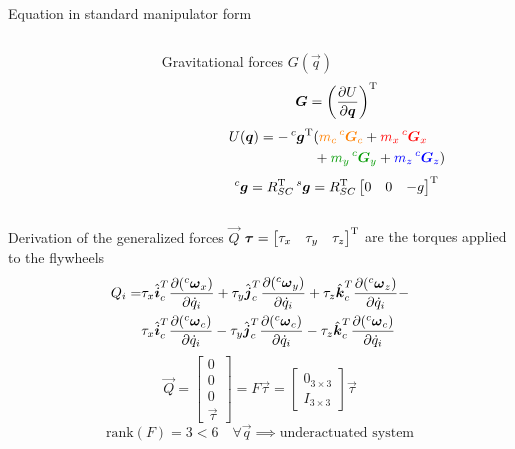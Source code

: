 \begin{frame}[shrink=30]{Equation in standard manipulator form}
\begin{columns}
\begin{column}{0.5\textwidth}
    \end{column}
    \begin{column}{0.5\textwidth}
      \begin{block}{Gravitational forces $G(\vec{q})$}
        \[
        \vec{G} =\left(\frac{\partial U}{\partial \vec{q}}\right) \transpose
        \]
        \[
        \begin{split}
          U(\vec{q}) = - \prescript{c}{}{\vec{g}} \transpose
          &(\cubicFrame{m_c  \prescript{c}{}{\vec{G}}_c} +
          \qx{m_x  \prescript{c}{}{\vec{G}}_x} \\
          &+\qy{m_y  \prescript{c}{}{\vec{G}}_y} +
          \qz{m_z  \prescript{c}{}{\vec{G}}_z})
        \end{split}
        \]
        \[
        \prescript{c}{}{\vec{g}} = R_{SC}\transpose \prescript{s}{}{\vec{g}} = R_{SC}\transpose 
        \begin{bmatrix}
          0 & 0 & -g
        \end{bmatrix} \transpose
        \]
      \end{block}
    \end{column}
  \end{columns}
\end{frame}

\begin{frame}{Derivation of the generalized forces $\vec{Q}$}
  $\vec{\tau} = \begin{bmatrix}
    \tau_x & \tau_y &\tau_z
  \end{bmatrix} \transpose$ are the torques applied to the flywheels
  \[
  \begin{split}
    Q_i = & \tau_{x} \hat{\vec{i}}_c^{T} \frac{\partial (\prescript{c}{}{\vec{\omega}_x})}{\partial \dot{q}_i} +
    \tau_{y} \hat{\vec{j}}_c^{T} \frac{\partial (\prescript{c}{}{\vec{\omega}_y})}{\partial \dot{q}_i} +
    \tau_{z} \hat{\vec{k}}_c^{T} \frac{\partial (\prescript{c}{}{\vec{\omega}_z})}{\partial \dot{q}_i} -\\
    &\tau_{x} \hat{\vec{i}}_c^{T} \frac{\partial (\prescript{c}{}{\vec{\omega}_c})}{\partial \dot{q}_i} -
    \tau_{y} \hat{\vec{j}}_c^{T} \frac{\partial (\prescript{c}{}{\vec{\omega}_c})}{\partial \dot{q}_i} -
    \tau_{z} \hat{\vec{k}}_c^{T} \frac{\partial (\prescript{c}{}{\vec{\omega}_c})}{\partial \dot{q}_i}
  \end{split}
  \]
  \[
  \vec{Q} =
  \begin{bmatrix}
    0 \\ 0 \\ 0 \\ \vec{\tau}
  \end{bmatrix}
  = F \vec{\tau} = 
  \begin{bmatrix}
    0_{3\times3} \\
    I_{3\times3}
  \end{bmatrix} \vec{\tau}
  \]
  \[ 
  \text{rank}(F) = 3 < 6 \quad \forall \vec{q} \implies \text{underactuated system}
  \]
\end{frame}

